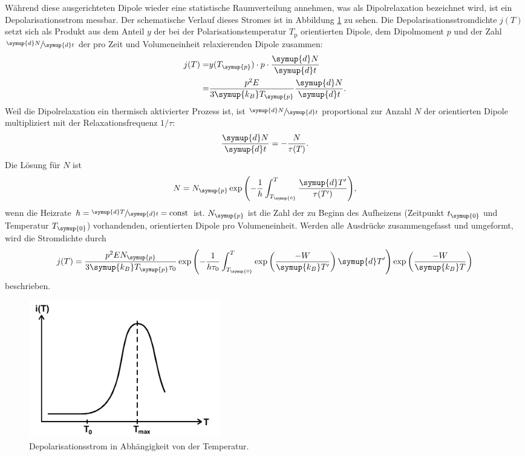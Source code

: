 Während diese ausgerichteten Dipole wieder eine statistische Raumverteilung annehmen, was als Dipolrelaxation bezeichnet wird, ist ein Depolarisationsstrom messbar.
Der schematische Verlauf dieses Stromes ist in Abbildung \ref{fig:Strom} zu sehen.
Die Depolarisationsstromdichte $j(T)$ setzt sich als Produkt aus dem Anteil $y$ der bei der Polarisationstemperatur $T_\text{p}$ orientierten Dipole, dem Dipolmoment $p$ und der Zahl $\sfrac{\symup{d}N}{\symup{d}t}$
der pro Zeit und Volumeneinheit relaxierenden Dipole zusammen:
\begin{align}
        j(T) =& y(T_\symup{p})\cdot p\cdot \frac{\symup{d}N}{\symup{d}t} \\
        =&\frac{p^2E}{3 \symup{k_B} T_\symup{p}}\frac{\symup{d}N}{\symup{d}t}.
\end{align}
Weil die Dipolrelaxation ein thermisch aktivierter Prozess ist, ist $\sfrac{\symup{d}N}{\symup{d}t}$ proportional zur Anzahl $N$ der orientierten Dipole multipliziert mit der Relaxationsfrequenz $1/\tau$:
\begin{equation*}
    \frac{\symup{d}N}{\symup{d}t}=-\frac{N}{\tau(T)}.
\end{equation*}
Die Lösung für $N$ ist
\begin{equation*}
    N=N_\symup{p} \exp{\left(-\frac{1}{h}\int_{T_{\symup{0}}}^{T}\frac{\symup{d}T'}{\tau(T')}\right)},
\end{equation*}
wenn die Heizrate $h=\sfrac{\symup{d}T}{\symup{d}t}=\text{const}$ ist.
$N_{\symup{p}}$ ist die Zahl der zu Beginn des Aufheizens (Zeitpunkt $t_{\symup{0}}$ und Temperatur $T_{\symup{0}}$) vorhandenden, orientierten Dipole pro Volumeneinheit.
Werden alle Ausdrücke zusammengefasst und umgeformt, wird die Stromdichte durch
\begin{equation}
\label{eqn:Stromdichte}
    j(T)=\frac{p^2 E N_{\symup{p}}}{3 \symup{k_B} T_{\symup{p}}\tau_0}\exp\left(-\frac{1}{h\tau_0}\int_{T_{\symup{0}}}^{T}\exp\left(\frac{-W}{\symup{k_B}T'}\right)\symup{d}T'\right)\exp\left(\frac{-W}{\symup{k_B}T}\right)
\end{equation}
beschrieben.
\begin{figure}[htb]
    \centering
    \includegraphics[height=6cm]{pics/Strom.png}
    \caption{Depolarisationsstrom in Abhängigkeit von der Temperatur. \cite{anleitung}}
    \label{fig:Strom}
\end{figure}
